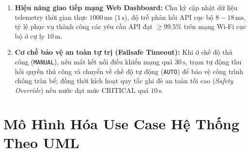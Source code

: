 \begin{enumerate}
    \item \textbf{Hiệu năng giao tiếp mạng Web Dashboard:} Chu kỳ cập nhật dữ liệu telemetry thời gian thực $1000\,\text{ms}$ ($1\,\text{s}$), độ trễ phản hồi API cục bộ $8 - 18\,\text{ms}$, tỷ lệ phục vụ thành công các yêu cầu API đạt $\ge 99.5\%$ trên mạng Wi-Fi cục bộ ở cự ly $10\,\text{m}$.
    \item \textbf{Cơ chế bảo vệ an toàn tự trị (Failsafe Timeout):} Khi ở chế độ thủ công (\texttt{MANUAL}), nếu mất kết nối điều khiển mạng quá $30\,\text{s}$, trạm tự động thu hồi quyền thủ công và chuyển về chế độ tự động (\texttt{AUTO}) để bảo vệ công trình chống tràn bể; đồng thời kích hoạt quy tắc ghi đè an toàn tối cao (\textit{Safety Override}) nếu nước đạt mức CRITICAL quá $10\,\text{s}$.
\end{enumerate}

\section{Mô Hình Hóa Use Case Hệ Thống Theo UML}

